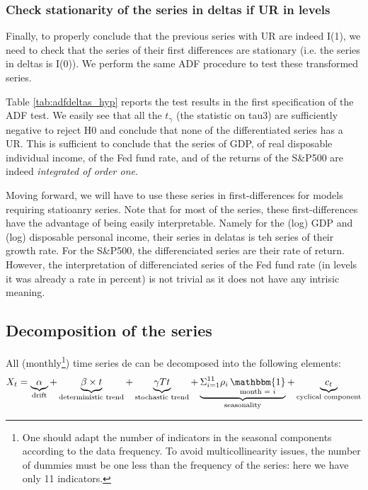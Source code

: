 \documentclass[hidelinks,12pts]{article}
\DeclareMathOperator{\1}{\mathbbm{1}}
\begin{document}




\subsubsection{Check stationarity of the series in deltas if UR in levels}

Finally, to properly conclude that the previous series with UR are indeed I(1), we need to check that the series of their first differences are stationary (i.e. the series in deltas is I(0)). 
We perform the same ADF procedure to test these transformed series. 



Table \ref{tab:adfdeltas_hyp} reports the test results in the first specification of the ADF test. 
We easily see that all the $t_\gamma$ (the statistic on tau3) are sufficiently negative to reject H0 and conclude that none of the differentiated series has a UR. 
This is sufficient to conclude that the series of GDP, of real disposable individual income, of the Fed fund rate, and of the returns of the S\&P500 are indeed \emph{integrated of order one}. 

Moving forward, we will have to use these series in first-differences for models requiring statioanry series.
Note that for most of the series, these first-differences have the advantage of being easily interpretable. 
Namely for the (log) GDP and (log) disposable personal income, their series in delatas is teh series of their growth rate. 
For the S\&P500, the differenciated series are their rate of return. 
However, the interpretation of differenciated series of the Fed fund rate (in levels it was already a rate in percent) is not trivial as it does not have any intrisic meaning.






\subsection{Decomposition of the series}

All (monthly\footnote{One should adapt the number of indicators in the seasonal components according to the data frequency. To avoid multicollinearity issues, the number of dummies must be one less than the frequency of the series: here we have only 11 indicators.}) time series de can be decomposed into the following elements: 
    \begin{equation*}
        X_t =  \underbrace{\alpha}_{\text{drift}} + \underbrace{\beta \times t}_{\text{deterministic trend}} + \underbrace{\gamma Tt}_{\text{stochastic trend}} + \underbrace{\Sigma_{i=1}^{11} \rho_i \1_{\text{month = }i}}_{\text{seasonality}} + \underbrace{c_t}_{\text{cyclical component}}
    \end{equation*}
\end{document}
